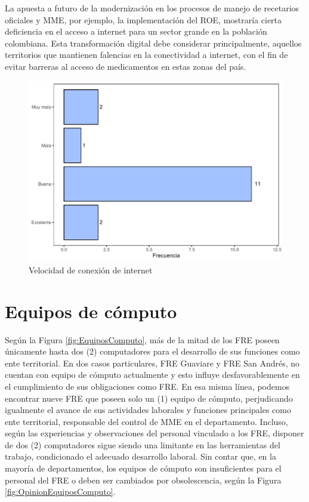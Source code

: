 \documentclass[
]{book}
\begin{document}
La apuesta a futuro de la modernización en los procesos de manejo de recetarios oficiales y MME, por ejemplo, la implementación del ROE, mostraría cierta deficiencia en el acceso a internet para un sector grande en la población colombiana. Esta transformación digital debe considerar principalmente, aquellos territorios que mantienen falencias en la conectividad a internet, con el fin de evitar barreras al acceso de medicamentos en estas zonas del país.

\begin{figure}
\includegraphics[width=0.85\linewidth]{InformeFinal_files/figure-latex/ConexionInternet-1} \caption{Velocidad de conexión de internet}\label{fig:ConexionInternet}
\end{figure}

\hypertarget{equipos-de-cuxf3mputo}{%
\section{Equipos de cómputo}\label{equipos-de-cuxf3mputo}}

Según la Figura \ref{fig:EquiposComputo}, más de la mitad de los FRE poseen únicamente hasta dos (2) computadores para el desarrollo de sus funciones como ente territorial. En dos casos particulares, FRE Guaviare y FRE San Andrés, no cuentan con equipo de cómputo actualmente y esto influye desfavorablemente en el cumplimiento de sus obligaciones como FRE. En esa misma línea, podemos encontrar nueve FRE que poseen solo un (1) equipo de cómputo, perjudicando igualmente el avance de sus actividades laborales y funciones principales como ente territorial, responsable del control de MME en el departamento. Incluso, según las experiencias y observaciones del personal vinculado a los FRE, disponer de dos (2) computadores sigue siendo una limitante en las herramientas del trabajo, condicionado el adecuado desarrollo laboral. Sin contar que, en la mayoría de departamentos, los equipos de cómputo son insuficientes para el personal del FRE o deben ser cambiados por obsolescencia, según la Figura \ref{fig:OpinionEquiposComputo}.
\end{document}

